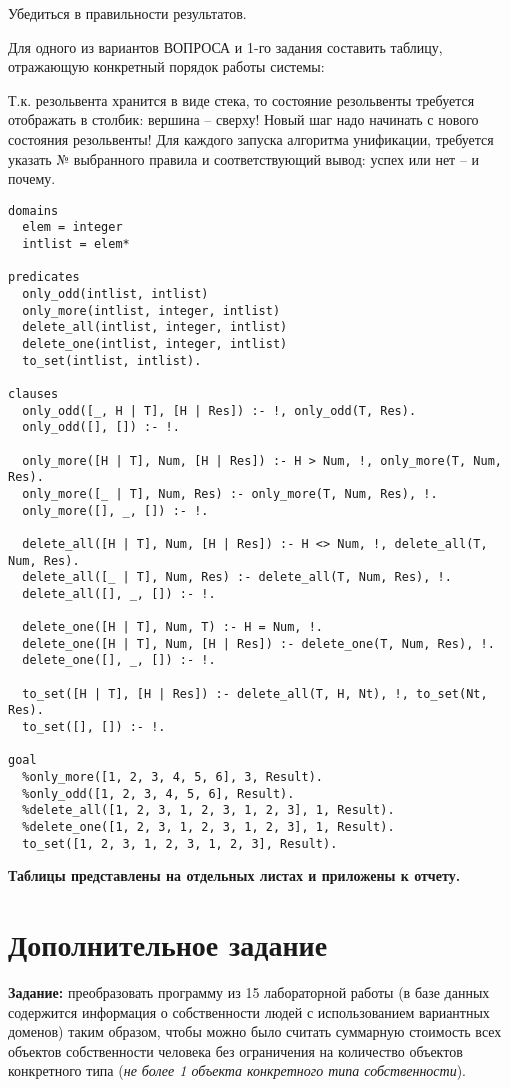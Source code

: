 Убедиться в правильности результатов.

Для одного из вариантов ВОПРОСА и 1-го задания составить таблицу, отражающую конкретный порядок работы системы:

Т.к. резольвента хранится в виде стека, то состояние резольвенты требуется отображать в столбик: вершина – сверху! Новый шаг надо начинать с нового состояния резольвенты! Для каждого запуска алгоритма унификации, требуется указать № выбранного правила и соответствующий вывод: успех или нет – и почему.

\begin{lstlisting}
domains
  elem = integer
  intlist = elem*

predicates
  only_odd(intlist, intlist)
  only_more(intlist, integer, intlist)
  delete_all(intlist, integer, intlist)
  delete_one(intlist, integer, intlist)
  to_set(intlist, intlist).

clauses
  only_odd([_, H | T], [H | Res]) :- !, only_odd(T, Res).
  only_odd([], []) :- !.

  only_more([H | T], Num, [H | Res]) :- H > Num, !, only_more(T, Num, Res).
  only_more([_ | T], Num, Res) :- only_more(T, Num, Res), !.
  only_more([], _, []) :- !.

  delete_all([H | T], Num, [H | Res]) :- H <> Num, !, delete_all(T, Num, Res).
  delete_all([_ | T], Num, Res) :- delete_all(T, Num, Res), !.
  delete_all([], _, []) :- !.

  delete_one([H | T], Num, T) :- H = Num, !.
  delete_one([H | T], Num, [H | Res]) :- delete_one(T, Num, Res), !.
  delete_one([], _, []) :- !.

  to_set([H | T], [H | Res]) :- delete_all(T, H, Nt), !, to_set(Nt, Res).
  to_set([], []) :- !.

goal
  %only_more([1, 2, 3, 4, 5, 6], 3, Result).
  %only_odd([1, 2, 3, 4, 5, 6], Result).
  %delete_all([1, 2, 3, 1, 2, 3, 1, 2, 3], 1, Result).
  %delete_one([1, 2, 3, 1, 2, 3, 1, 2, 3], 1, Result).
  to_set([1, 2, 3, 1, 2, 3, 1, 2, 3], Result).
\end{lstlisting}

\textbf{Таблицы представлены на отдельных листах и приложены к отчету.}

\chapter*{Дополнительное задание}

\textbf{Задание:} преобразовать программу из 15 лабораторной работы (в базе данных содержится информация о собственности людей с использованием вариантных доменов) таким образом, чтобы можно было считать суммарную стоимость всех объектов собственности человека без ограничения на количество объектов конкретного типа (\textit{не более 1 объекта конкретного типа собственности}).

